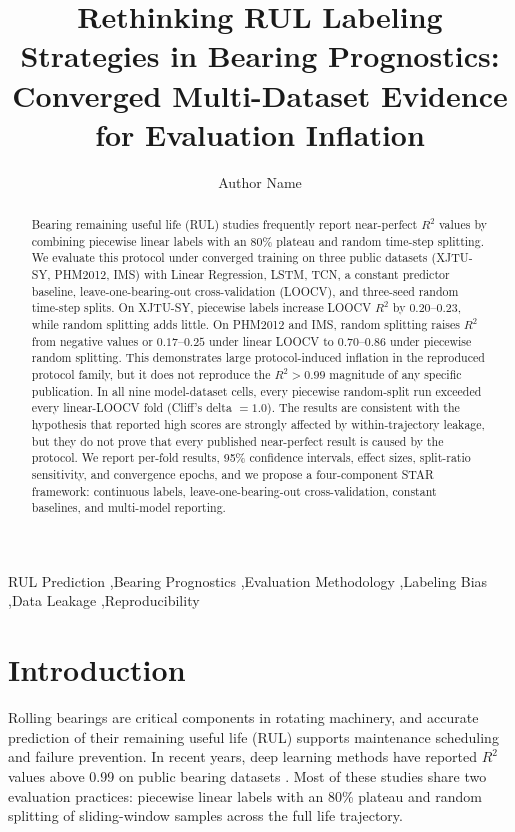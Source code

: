 \documentclass[5p,twocolumn]{elsarticle}
\begin{document}
\begin{frontmatter}

\title{Rethinking RUL Labeling Strategies in Bearing Prognostics: Converged Multi-Dataset Evidence for Evaluation Inflation}

\author[1]{Author Name}
\address[1]{School of Mechanical Engineering, University, City, Country}

\begin{abstract}
Bearing remaining useful life (RUL) studies frequently report near-perfect $R^2$ values by combining piecewise linear labels with an 80\% plateau and random time-step splitting. We evaluate this protocol under converged training on three public datasets (XJTU-SY, PHM2012, IMS) with Linear Regression, LSTM, TCN, a constant predictor baseline, leave-one-bearing-out cross-validation (LOOCV), and three-seed random time-step splits. On XJTU-SY, piecewise labels increase LOOCV $R^2$ by $0.20$--$0.23$, while random splitting adds little. On PHM2012 and IMS, random splitting raises $R^2$ from negative values or $0.17$--$0.25$ under linear LOOCV to $0.70$--$0.86$ under piecewise random splitting. This demonstrates large protocol-induced inflation in the reproduced protocol family, but it does not reproduce the $R^2>0.99$ magnitude of any specific publication. In all nine model-dataset cells, every piecewise random-split run exceeded every linear-LOOCV fold (Cliff's delta $=1.0$). The results are consistent with the hypothesis that reported high scores are strongly affected by within-trajectory leakage, but they do not prove that every published near-perfect result is caused by the protocol. We report per-fold results, 95\% confidence intervals, effect sizes, split-ratio sensitivity, and convergence epochs, and we propose a four-component STAR framework: continuous labels, leave-one-bearing-out cross-validation, constant baselines, and multi-model reporting.
\end{abstract}

\begin{keyword}
RUL Prediction \sep Bearing Prognostics \sep Evaluation Methodology \sep Labeling Bias \sep Data Leakage \sep Reproducibility
\end{keyword}

\end{frontmatter}

\section{Introduction}
Rolling bearings are critical components in rotating machinery, and accurate prediction of their remaining useful life (RUL) supports maintenance scheduling and failure prevention. In recent years, deep learning methods have reported $R^2$ values above 0.99 on public bearing datasets \cite{li2020multiscale,zhang2020lstm,chen2021gru,mo2022transformer}. Most of these studies share two evaluation practices: piecewise linear labels with an 80\% plateau and random splitting of sliding-window samples across the full life trajectory.
\end{document}
